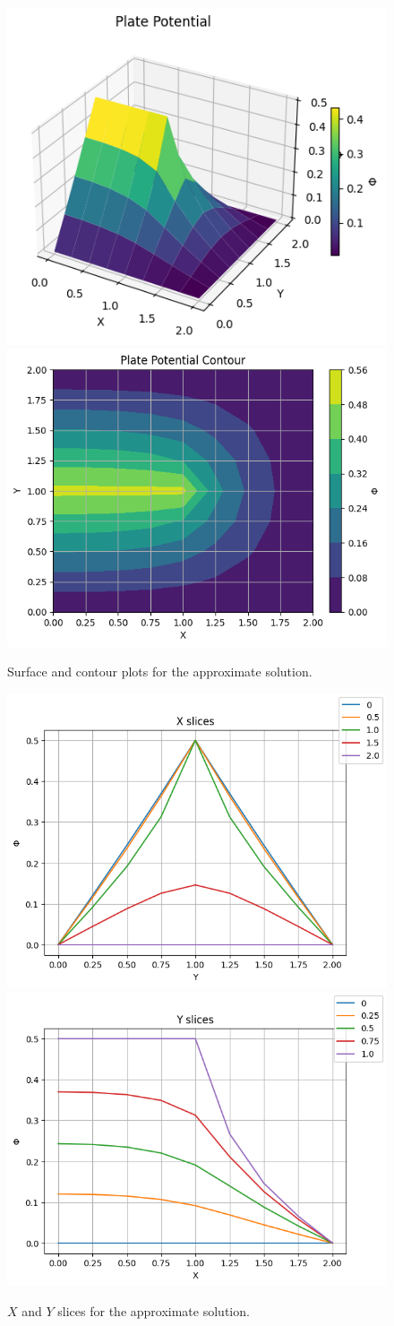 \documentclass{article}
\begin{document}
\begin{figure}
    \centering
    \includegraphics[width=0.49\linewidth]{images/surfaceplot1.png}
    \includegraphics[width=0.49\linewidth]{images/contourplot1.png}
    \caption{Surface and contour plots for the approximate solution.}
\end{figure}

\begin{figure}
    \centering
    \includegraphics[width=0.49\linewidth]{images/xslice1.png}
    \includegraphics[width=0.49\linewidth]{images/yslice1.png}
    \caption{\(X\) and \(Y\) slices for the approximate solution.}
\end{figure}
\end{document}
